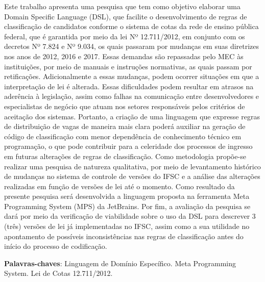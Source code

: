 
\begin{resumo}[Resumo] \noindent 
Este trabalho apresenta uma pesquisa que tem como objetivo elaborar uma Domain Specific Language (DSL), que facilite o desenvolvimento de regras de classificação de candidatos conforme o sistema de cotas da rede de ensino pública federal, que é garantida por meio da lei Nº 12.711/2012, em conjunto com os decretos Nº 7.824 e Nº 9.034, os quais passaram por mudanças em suas diretrizes nos anos de 2012, 2016 e 2017. Essas demandas são repassadas pelo \gls{MEC} às instituições, por meio de manuais e instruções normativas, as quais passam por retificações. Adicionalmente a essas mudanças, podem ocorrer situações em que a interpretação de lei é alterada. Essas dificuldades podem resultar em atrasos na aderência à legislação, assim como falhas na comunicação entre desenvolvedores e especialistas de negócio que atuam nos setores responsáveis pelos critérios de aceitação dos sistemas. Portanto, a criação de uma linguagem que expresse regras de distribuição de vagas de maneira mais clara poderá auxiliar na geração de código de classificação com menor dependência de conhecimento técnico em programação, o que pode contribuir para a celeridade dos processos de ingresso em futuras alterações de regras de classificação. Como metodologia propõe-se realizar uma pesquisa de natureza qualitativa, por meio de levantamento histórico de mudanças no sistema de controle de versões do \gls{IFSC} e a análise das alterações realizadas em função de versões de lei até o momento. Como resultado da presente pesquisa será desenvolvida a linguagem proposta na ferramenta Meta Programming System (MPS) da JetBrains. Por fim, a avaliação da pesquisa se dará por meio da verificação de viabilidade sobre o uso da DSL para descrever 3 (três) versões de lei já implementadas no IFSC, assim como a sua utilidade no apontamento de possíveis inconsistências nas regras de classificação antes do início do processo de codificação.

 \vspace{\onelineskip}
    
 \noindent
 \textbf{Palavras-chaves}: Linguagem de Domínio Específico. Meta Programming System. Lei de Cotas 12.711/2012.
\end{resumo}





 
